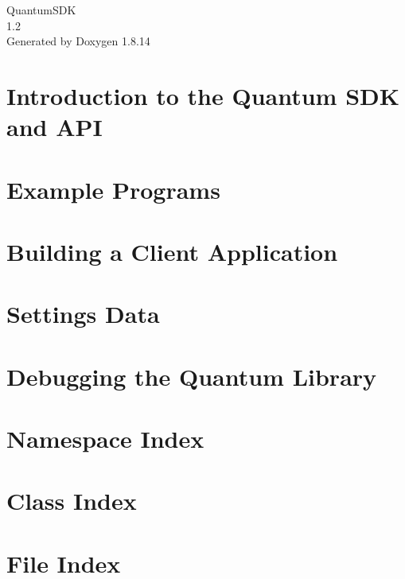 \documentclass[twoside]{book}
\newcommand{\+}{\discretionary{\mbox{\scriptsize$\hookleftarrow$}}{}{}}
\newcommand{\clearemptydoublepage}{%
  \newpage{\pagestyle{empty}\cleardoublepage}%
}
\begin{document}
\hypersetup{pageanchor=false,
             bookmarksnumbered=true,
             pdfencoding=unicode
            }
\begin{titlepage}
\vspace*{7cm}
\begin{center}%
{\Large Quantum\+S\+DK \\[1ex]\large 1.\+2 }\\
\vspace*{1cm}
{\large Generated by Doxygen 1.8.14}\\
\end{center}
\end{titlepage}
\clearemptydoublepage
{}
\tableofcontents
\clearemptydoublepage
{}
\hypersetup{pageanchor=true}

\chapter{Introduction to the Quantum S\+DK and A\+PI}
\label{index}\hypertarget{index}{}
\chapter{Example Programs}
\label{page1}

\chapter{Building a Client Application}
\label{page2}

\chapter{Settings Data}
\label{page3}

\chapter{Debugging the Quantum Library}
\label{page4}

\chapter{Namespace Index}

\chapter{Class Index}

\chapter{File Index}

\end{document}
